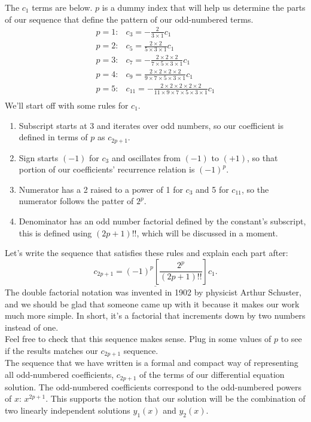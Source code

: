 \documentclass[a4paper,12pt]{article}
\begin{document}
The $c_1$ terms are below. $p$ is a dummy index that will help us determine the parts of our sequence that define the pattern of our odd-numbered terms.
$$
\begin{array}{rl}
p=1 :& c_3 = -\frac{2}{3\times1}c_1\\
p=2 :& c_5 = \frac{2\times2}{5\times3\times1}c_1\\
p=3 :& c_7=-\frac{2\times2\times2}{7\times5\times3\times1}c_1\\
p=4 :& c_9 = \frac{2\times2\times2\times2}{9\times7\times5\times3\times1}c_1\\
p=5 :&  c_{11} = -\frac{2\times2\times2\times2\times2}{11\times9\times7\times5\times3\times1}c_1\\
\end{array}
$$
We'll start off with some rules for $c_1$.
\begin{enumerate}
	\item Subscript starts at 3 and iterates over odd numbers, so our coefficient is defined in terms of $p$ as $c_{2p+1}$.
	\item Sign starts $(-1)$ for $c_3$ and oscillates from $(-1)$ to $(+1)$, so that portion of our coefficients' recurrence relation is $(-1)^p$.
	\item Numerator has a 2 raised to a power of 1 for $c_3$ and 5 for $c_{11}$, so the numerator follows the patter of $2^p$.
	\item Denominator has an odd number factorial defined by the constant's subscript, this is defined using $(2p+1)!!$, which will be discussed in a moment.
\end{enumerate}
Let's write the sequence that satisfies these rules and explain each part after:
$$ \underline{c_{2p+1} = (-1)^{p}\left[\frac{2^{p}}{(2p+1)!!}\right]c_1.}$$
The double factorial notation was invented in 1902 by physicist Arthur Schuster, and we should be glad that someone came up with it because it makes our work much more simple. In short, it's a factorial that increments down by two numbers instead of one. \\

Feel free to check that this sequence makes sense. Plug in some values of $p$ to see if the results matches our $c_{2p+1}$ sequence.\\

The sequence that we have written is a formal and compact way of representing all odd-numbered coefficients, $c_{2p+1}$ of the terms of our differential equation solution. The odd-numbered coefficients correspond to the odd-numbered powers of $x$: $x^{2p+1}$. This supports the notion that our solution will be the combination of two linearly independent solutions $y_1(x)$ and $y_2(x)$.\\
\end{document}
